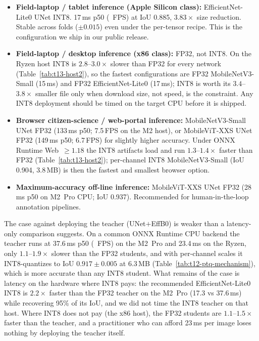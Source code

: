 \begin{itemize}
\item \textbf{Field-laptop / tablet inference (Apple Silicon class):} EfficientNet-Lite0 UNet INT8. 17\,ms p50 (\deployableMTwoFPS~FPS) at IoU 0.885, $3.83\times$ size reduction. Stable across folds ($\pm 0.015$) even under the per-tensor recipe. This is the configuration we ship in our public release.
\item \textbf{Field-laptop / desktop inference (x86 class):} FP32, not INT8. On the Ryzen host INT8 is $2.8$--$3.0\times$ slower than FP32 for every network (Table~\ref{tab:t13-host2}), so the fastest configurations are FP32 MobileNetV3-Small (15\,ms) and FP32 EfficientNet-Lite0 (17\,ms); INT8 is worth its $3.4$--$3.8\times$ smaller file only when download size, not speed, is the constraint. Any INT8 deployment should be timed on the target CPU before it is shipped.
\item \textbf{Browser citizen-science / web-portal inference:} MobileNetV3-Small UNet FP32 (133\,ms p50; 7.5\,FPS on the M2 host), or MobileViT-XXS UNet FP32 (149\,ms p50; 6.7\,FPS) for slightly higher accuracy. Under ONNX Runtime Web~$\geq 1.18$ the INT8 artifacts load and run $1.3$--$1.4\times$ faster than FP32 (Table~\ref{tab:t13-host2}); per-channel INT8 MobileNetV3-Small (IoU 0.904, 3.8\,MB) is then the fastest and smallest browser option.
\item \textbf{Maximum-accuracy off-line inference:} MobileViT-XXS UNet FP32 (28\,ms p50 on M2~Pro CPU; IoU 0.937). Recommended for human-in-the-loop annotation pipelines.
\end{itemize}

The case against deploying the teacher (UNet$+$EffB0) is weaker than a latency-only comparison suggests. On a common ONNX Runtime CPU backend the teacher runs at 37.6\,ms p50 (\teacherMTwoFPS~FPS) on the M2~Pro and 23.4\,ms on the Ryzen, only $1.1$--$1.9\times$ slower than the FP32 students, and with per-channel scales it INT8-quantizes to IoU $0.917 \pm 0.005$ at 6.3\,MB (Table~\ref{tab:t12-ptq-mechanism}), which is more accurate than any INT8 student. What remains of the case is latency on the hardware where INT8 pays: the recommended EfficientNet-Lite0 INT8 is $2.2\times$ faster than the FP32 teacher on the M2~Pro (17.3 vs 37.6\,ms) while recovering 95\% of its IoU, and we did not time the INT8 teacher on that host. Where INT8 does not pay (the x86 host), the FP32 students are $1.1$--$1.5\times$ faster than the teacher, and a practitioner who can afford 23\,ms per image loses nothing by deploying the teacher itself.


